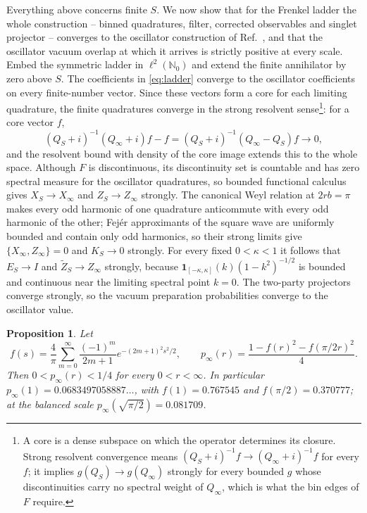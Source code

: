 \documentclass[11pt,a4paper]{article}
\newtheorem{proposition}{Proposition}
\newcommand{\Zt}{\widetilde Z}
\begin{document}
Everything above concerns finite $S$. We now show that for the Frenkel ladder the whole construction -- binned quadratures, filter, corrected observables and singlet projector -- converges to the oscillator construction of Ref.~\cite{Sorella2026}, and that the oscillator vacuum overlap at which it arrives is strictly positive at every scale. Embed the symmetric ladder in $\ell^2(\mathbb N_0)$ and extend the finite annihilator by zero above $S$. The coefficients in \eqref{eq:ladder} converge to the oscillator coefficients on every finite-number vector. Since these vectors form a core for each limiting quadrature, the finite quadratures converge in the strong resolvent sense\footnote{A core is a dense subspace on which the operator determines its closure. Strong resolvent convergence means $(Q_S+i)^{-1}f\to(Q_\infty+i)^{-1}f$ for every $f$; it implies $g(Q_S)\to g(Q_\infty)$ strongly for every bounded $g$ whose discontinuities carry no spectral weight of $Q_\infty$, which is what the bin edges of $F$ require.}: for a core vector $f$,
\begin{equation}
(Q_S+i)^{-1}(Q_\infty+i)f-f=(Q_S+i)^{-1}(Q_\infty-Q_S)f\longrightarrow0,
\end{equation}
and the resolvent bound with density of the core image extends this to the whole space. Although $F$ is discontinuous, its discontinuity set is countable and has zero spectral measure for the oscillator quadratures, so bounded functional calculus gives $X_S\to X_\infty$ and $Z_S\to Z_\infty$ strongly. The canonical Weyl relation at $2rb=\pi$ makes every odd harmonic of one quadrature anticommute with every odd harmonic of the other; Fej\'er approximants of the square wave are uniformly bounded and contain only odd harmonics, so their strong limits give $\{X_\infty,Z_\infty\}=0$ and $K_S\to0$ strongly. For every fixed $0<\kappa<1$ it follows that $E_S\to I$ and $\Zt_S\to Z_\infty$ strongly, because $\mathbf 1_{[-\kappa,\kappa]}(k)(1-k^2)^{-1/2}$ is bounded and continuous near the limiting spectral point $k=0$. The two-party projectors converge strongly, so the vacuum preparation probabilities converge to the oscillator value.

\begin{proposition}
\label{prop:positive}
Let
\begin{equation}
f(s)=\frac4\pi\sum_{m=0}^\infty\frac{(-1)^m}{2m+1}e^{-(2m+1)^2s^2/2},\qquad
p_\infty(r)=\frac{1-f(r)^2-f(\pi/2r)^2}{4}.
\label{eq:f}
\end{equation}
Then $0<p_\infty(r)<1/4$ for every $0<r<\infty$. In particular $p_\infty(1)=0.0683497058887\ldots$, with $f(1)=0.767545$ and $f(\pi/2)=0.370777$; at the balanced scale $p_\infty(\sqrt{\pi/2})=0.081709$.
\end{proposition}
\end{document}
